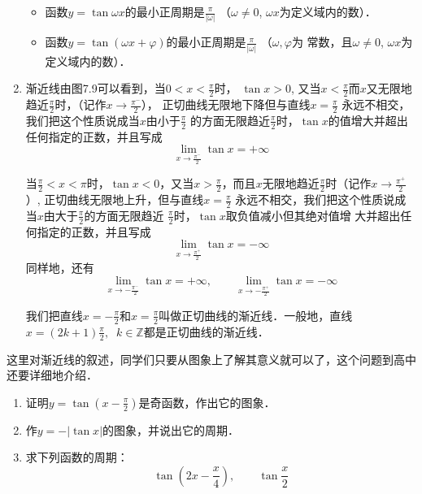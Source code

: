 \begin{enumerate}
\begin{itemize}
    \item 函数$y=\tan \omega x$的最小正周期是$\frac{\pi}{|\omega|}$ （$\omega\ne 0$,  $\omega x$为定义域内的数）．

    \item    函数$y=\tan (\omega x+\varphi)$的最小正周期是$\frac{\pi}{|\omega|}$ （$\omega,\varphi$为
    常数，且$\omega\ne 0$, $\omega x$为定义域内的数）．
\end{itemize}

\item  渐近线\quad 由图7.9可以看到，当$0<x<\frac{\pi}{2}$时，
$\tan x>0$, 又当$x<\frac{\pi}{2}$而$x$又无限地趋近$\frac{\pi}{2}$时，（记作$x\to \frac{\pi^-}{2}$），
正切曲线无限地下降但与直线$x=\frac{\pi}{2}$
永远不相交，我们把这个性质说成当$x$由小于$\frac{\pi}{2}$
的方面无限趋近$\frac{\pi}{2}$时，$\tan x$的值增大并超出任何指定的正数，并且写成
\[\lim_{x\to\tfrac{\pi^-}{2}}\tan x=+\infty  \]

当$\frac{\pi}{2}<x<\pi$时，$\tan x<0$，又当$x>\frac{\pi}{2}$，而且$x$无限地趋近$\frac{\pi}{2}$时（记作$x\to\frac{\pi^+}{2}$）,
正切曲线无限地上升，但与直线$x=\frac{\pi}{2}$
永远不相交，我们把这个性质说成当$x$由大于$\frac{\pi}{2}$的方面无限趋近
$\frac{\pi}{2}$时，$\tan x$取负值减小但其绝对值增
大并超出任何指定的正数，并且写成
\[\lim_{x\to\tfrac{\pi^+}{2}}\tan x=-\infty  \]
同样地，还有
\[\lim_{x\to -\tfrac{\pi^-}{2}}\tan x=+\infty,\qquad  \lim_{x\to -\tfrac{\pi^+}{2}}\tan x=-\infty \]

我们把直线$x=-\frac{\pi}{2}$和$x=\frac{\pi}{2}$叫做正切曲线的渐近线．一般地，直线$x=(2k+1)\frac{\pi}{2},\;\; k\in\mathbb{Z}$都是正切曲线的渐近线．
\end{enumerate}

\begin{rmk}
    这里对渐近线的叙述，同学们只要从图象上了解其意义就可以了，这个问题到高中还要详细地介绍． 
\end{rmk}

\begin{ex}
\begin{enumerate}
    \item 证明$y=\tan\left(x-\frac{\pi}{2}\right)$是奇函数，作出它的图象．
    \item 作$y=-|\tan x|$的图象，并说出它的周期．
    \item 求下列函数的周期：
    \[\tan\left(2x-\frac{x}{4}\right),\qquad \tan \frac{x}{2} \]
\end{enumerate}
\end{ex}

